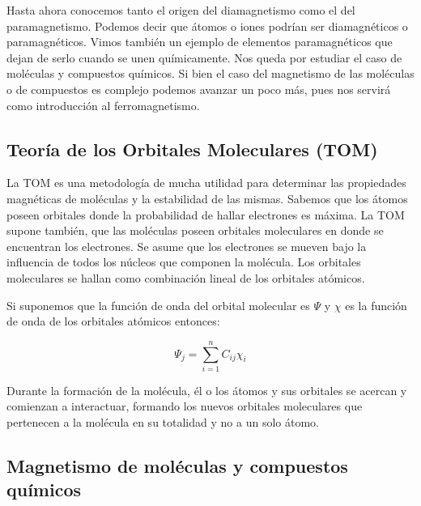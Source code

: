Hasta ahora conocemos tanto el origen del diamagnetismo como el del paramagnetismo. Podemos decir que átomos o iones podrían ser diamagnéticos o paramagnéticos. Vimos también un ejemplo de elementos paramagnéticos que dejan de serlo cuando se unen químicamente. Nos queda por estudiar el caso de moléculas y compuestos químicos. Si bien el caso del magnetismo de las moléculas o de compuestos es complejo podemos avanzar un poco más, pues nos servirá como introducción al ferromagnetismo.

\subsection{Teoría de los Orbitales Moleculares (TOM)}

La TOM es una metodología de mucha utilidad para determinar las propiedades magnéticas de moléculas y la estabilidad de las mismas. Sabemos que los átomos poseen orbitales donde la probabilidad de hallar electrones es máxima. La TOM supone también, que las moléculas poseen orbitales moleculares en donde se encuentran los electrones. Se asume que los electrones se mueven bajo la influencia de todos los núcleos que componen la molécula. Los orbitales moleculares se hallan como combinación lineal de los orbitales atómicos.

Si suponemos que la función de onda del orbital molecular es $\Psi$ y $\chi$ es la función de onda de los orbitales atómicos entonces:

\begin{equation}
	\Psi_{j} = \sum_{i=1}^{n}C_{ij}\chi_{i}
\end{equation}

Durante la formación de la molécula, él o los átomos y sus orbitales se acercan y comienzan a interactuar, formando los nuevos orbitales moleculares que pertenecen a la molécula en su totalidad y no a un solo átomo.

\subsection{Magnetismo de moléculas y compuestos químicos}

